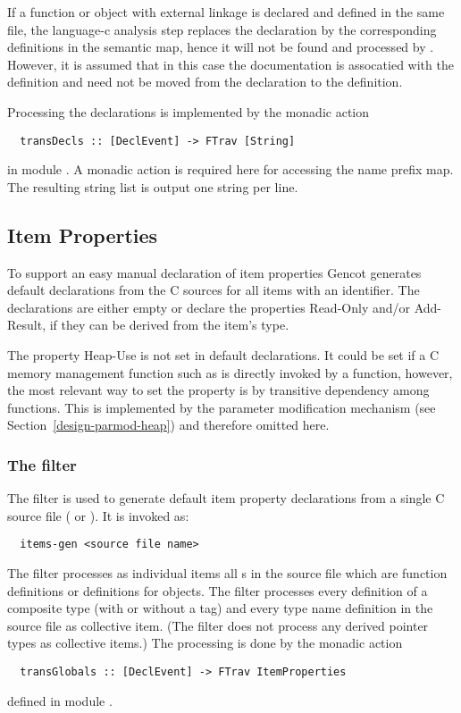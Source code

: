 If a function or object with external linkage is declared and defined in the same file, the language-c analysis step
replaces the declaration by the corresponding definitions in the semantic map, hence it will not be found and processed
by . However, it is assumed that in this case the documentation is assocatied with the definition
and need not be moved from the declaration to the definition.

Processing the declarations is implemented by the monadic action
\begin{verbatim}
  transDecls :: [DeclEvent] -> FTrav [String]
\end{verbatim}
in module . A monadic action is required here for accessing the name prefix map.
The resulting string list is output one string per line.

\subsection{Item Properties}
\label{impl-ccomps-itemprops}

To support an easy manual declaration of item properties Gencot generates default declarations from the C sources for all 
items with an identifier. The declarations are either empty or declare the properties Read-Only and/or Add-Result, if they
can be derived from the item's type. 

The property Heap-Use is not set in default declarations. It could be set if a C memory management function such as  
is directly invoked by a function, however, the most relevant way to set the property is by transitive dependency among functions.
This is implemented by the parameter modification mechanism (see Section~\ref{design-parmod-heap}) and therefore omitted here.

\subsubsection{The filter }

The filter  is used to generate default item property declarations from a single C source file ( or ).
It is invoked as:
\begin{verbatim}
  items-gen <source file name>
\end{verbatim}

The filter processes as individual items all s in the source file which are function
definitions or definitions for objects. The filter processes every definition of a composite type 
(with or without a tag) and every type name definition in the source file as collective item. (The filter does not
process any derived pointer types as collective items.) The processing is done by the monadic action
\begin{verbatim}
  transGlobals :: [DeclEvent] -> FTrav ItemProperties
\end{verbatim}
defined in module .

